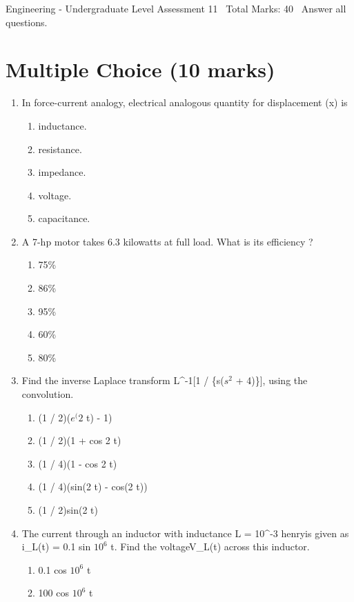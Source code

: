 \documentclass[12pt]{article}
\begin{document}
\begin{center}
Engineering - Undergraduate Level Assessment 11 \
Total Marks: 40 \
Answer all questions.
\end{center}

\section*{Multiple Choice (10 marks)}
\begin{enumerate}[label=\arabic*.]
\item In force-current analogy, electrical analogous quantity for displacement (x) is
\begin{enumerate}[label=(\alph*)]
    \item inductance.
    \item resistance.
    \item impedance.
    \item voltage.
    \item capacitance.
\end{enumerate}
\item A 7-hp motor takes 6.3 kilowatts at full load. What is its efficiency ?
\begin{enumerate}[label=(\alph*)]
    \item 75\%
    \item 86\%
    \item 95\%
    \item 60\%
    \item 80\%
\end{enumerate}
\item Find the inverse Laplace transform L^-1[1 / \{s($s^2$ + 4)\}], using the convolution.
\begin{enumerate}[label=(\alph*)]
    \item (1 / 2)($e^(2$ t) - 1)
    \item (1 / 2)(1 + cos 2 t)
    \item (1 / 4)(1 - cos 2 t)
    \item (1 / 4)(sin(2 t) - cos(2 t))
    \item (1 / 2)sin(2 t)
\end{enumerate}
\item The current through an inductor with inductance L = 10^-3 henryis given as i\_L(t) = 0.1 sin $10^6$ t. Find the voltageV\_L(t) across this inductor.
\begin{enumerate}[label=(\alph*)]
    \item 0.1 cos $10^6$ t
    \item 100 cos $10^6$ t

\end{enumerate}
\end{enumerate}
\end{document}
